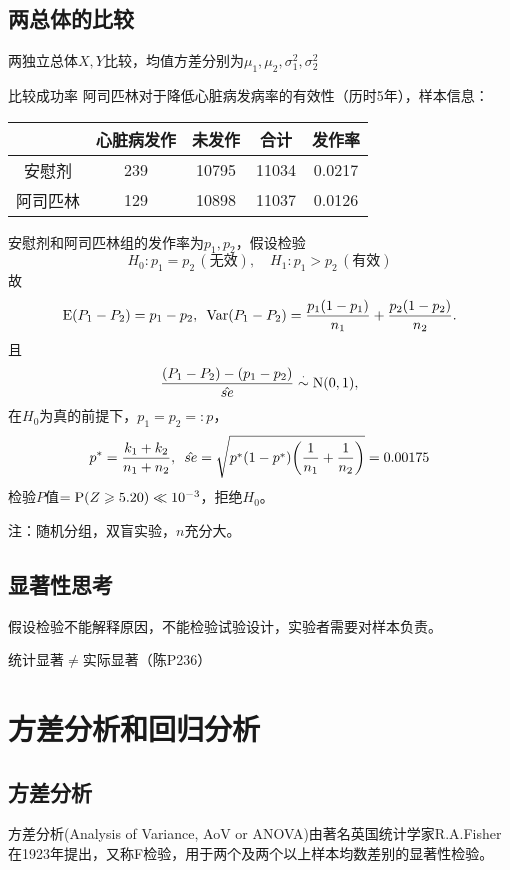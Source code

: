 \subsection{两总体的比较}
两独立总体$X,Y$比较，均值方差分别为$\mu_1,\mu_2,\sigma_1^2,\sigma_2^2$

\begin{example}{比较成功率}{}
	阿司匹林对于降低心脏病发病率的有效性（历时5年），样本信息：
	\begin{center}
		\begin{tabular}{c|cccc}
			\toprule
			&心脏病发作&未发作&合计&发作率\\
			\midrule
			安慰剂&239&10795&11034&0.0217\\
			阿司匹林&129&10898&11037&0.0126\\
			\bottomrule
		\end{tabular}
	\end{center}
	安慰剂和阿司匹林组的发作率为$p_1,p_2$，假设检验 
	\[
		H_0:p_1=p_2\,(\text{无效}),\quad H_1:p_1>p_2\,(\text{有效})
	\]
	故
	\[
		\E(P_1-P_2)=p_1-p_2,\enspace\Var(P_1-P_2)=\frac{p_1(1-p_1)}{n_1}+\frac{p_2(1-p_2)}{n_2}.
	\]
	且
	\[
		\frac{(P_1-P_2)-(p_1-p_2)}{\hat{se}}\dotsim\Norm(0,1),
	\]
	在$H_0$为真的前提下，$p_1=p_2=:p$，
	\begin{align*}
		p^\ast=\frac{k_1+k_2}{n_1+n_2},\enspace\hat{se}=\sqrt{p^\ast(1-p^\ast)\biggkh{\frac1{n_1}+\frac1{n_2}}}=0.00175
	\end{align*}
	检验$P$值$=\P(Z\geqslant 5.20)\ll 10^{-3}$，拒绝$H_0$。
\end{example}
注：随机分组，双盲实验，$n$充分大。

\subsection{显著性思考}
假设检验不能解释原因，不能检验试验设计，实验者需要对样本负责。

统计显著$\neq$实际显著（陈P236）

\clearpage
\section{方差分析和回归分析}
\subsection{方差分析}
方差分析(Analysis of Variance, AoV or ANOVA)由著名英国统计学家R.A.Fisher在1923年提出，又称F检验，用于两个及两个以上样本均数差别的显著性检验。

